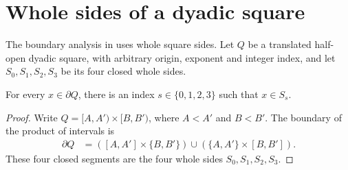 \section{Whole sides of a dyadic square}
\label{sec:area_law_cell_sides}

The boundary analysis in \cite[Section~11]{OpenAI2026AreaLaw}
uses whole square sides. Let $Q$ be a translated half-open dyadic
square, with arbitrary origin, exponent and integer index, and let
$S_0,S_1,S_2,S_3$ be its four closed whole sides.


\begin{lemma}
    \label{thm:area_law_square_frontier_side}
    \leanok
    For every $x\in\partial Q$, there is an index $s\in\{0,1,2,3\}$
    such that $x\in S_s$.
\end{lemma}
\begin{proof}\leanok
    Write $Q=\lbrack A,A')\times\lbrack B,B')$, where $A<A'$ and $B<B'$.
    The boundary of the product of intervals is
    \begin{align}
        \partial Q & =([A,A']\times\{B,B'\})
        \cup(\{A,A'\}\times[B,B']).
    \end{align}
    These four closed segments are the four whole sides $S_0,S_1,S_2,S_3$.
\end{proof}
